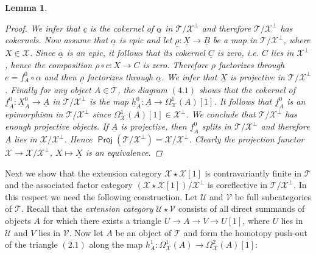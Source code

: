 \documentclass[oneside, a4paper,reqno]{amsart}
\numberwithin{equation}{section}
\newtheorem{lem}[thm]{Lemma}
\theoremstyle{definition}
\begin{document}
\begin{lem}
\begin{proof}
We infer that $\underline{c}$ is the cokernel of $\underline{\alpha}$ in ${\mathcal T}/{\mathcal X}^{\bot}$ and therefore ${\mathcal T}/{\mathcal X}^{\bot}$ has cokernels. Now assume that $\underline{\alpha}$ is epic and let $\underline{\rho} \colon {\underline X} {\longrightarrow} {\underline B}$ be a map in ${\mathcal T}/{\mathcal X}^{\bot}$, where $X \in {\mathcal X}$.  Since $\underline{\alpha}$ is an epic, it follows that its cokernel ${\underline C}$ is zero, i.e. $C$ lies in ${\mathcal X}^{\bot}$, hence the composition $\rho \circ c \colon X {\longrightarrow} C$ is zero. Therefore $\rho$ factorizes through $e = f^{0}_{A} \circ \alpha$ and then $\underline{\rho}$ factorizes through $\underline{\alpha}$. We infer that ${\underline X}$ is projective in ${\mathcal T}/{\mathcal X}^{\bot}$. Finally for any object $A \in {\mathcal T}$, the diagram $(4.1)$ shows that the cokernel of ${\underline f}^{0}_{A} \colon {\underline X}^{0}_{A} {\longrightarrow} {\underline A}$ in ${\mathcal T}/{\mathcal X}^{\bot}$ is the map $\underline{h}^{0}_{A} \colon {\underline A} {\longrightarrow} \Omega^{1}_{\mathcal X}(A)[1]$. It follows that ${\underline f}^{0}_{A} $ is an epimorphism in ${\mathcal T}/{\mathcal X}^{\bot}$ since  $\Omega^{1}_{\mathcal X}(A)[1]\in {\mathcal X}^{\bot}$.  We conclude that ${\mathcal T}/{\mathcal X}^{\bot}$ has enough projective objects. If ${\underline A}$ is projective, then ${\underline f}^{0}_{A}$ splits in ${\mathcal T}/{\mathcal X}^{\bot}$ and therefore ${\underline A}$ lies in ${\mathcal X}/{\mathcal X}^{\bot}$. Hence $\operatorname*{\mathsf{Proj}}({\mathcal T}/{\mathcal X}^{\bot}) = {\mathcal X}/{\mathcal X}^{\bot}$.  Clearly the projection functor ${\mathcal X} {\longrightarrow} {\mathcal X}/{\mathcal X}^{\bot}$, $X \longmapsto \underline{X}$ is an equivalence.     
\end{proof}
\end{lem}

Next we show that the extension category ${\mathcal X}\star{\mathcal X}[1]$ is contravariantly finite in ${\mathcal T}$ and the associated factor category $({\mathcal X}\star {\mathcal X}[1])/{\mathcal X}^{\bot}$ is coreflective in ${\mathcal T}/{\mathcal X}^{\bot}$. 
In this respect we need the following construction. Let ${\mathcal U}$ and ${\mathcal V}$ be full subcategories of ${\mathcal T}$. Recall that the {\em extension category} ${\mathcal U}\star{\mathcal V}$ consists of all direct summands of objects $A$ for which there exists a triangle $U{\longrightarrow} A {\longrightarrow} V {\longrightarrow} U[1]$, where $U$ lies in ${\mathcal U}$ and $V$ lies in ${\mathcal V}$.  
Now let $A$ be an object of ${\mathcal T}$ and form the homotopy push-out of the triangle 
$(2.1)$ along the map $h^{1}_{A} \colon \Omega^{1}_{\mathcal X}(A) {\longrightarrow} \Omega^{2}_{\mathcal X}(A)[1]$:
\end{document}
